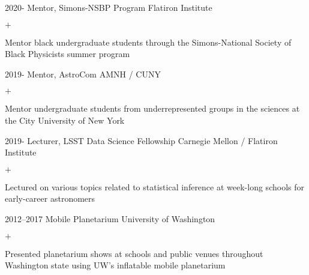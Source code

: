 \documentclass[]{luger-cv} %
\begin{document}
\begin{entrylist}


    \entry
    {2020-}
    {Mentor, Simons-NSBP Program}
    {Flatiron Institute}
    {%
        \vspace{-1em}
        \begin{list}{$+$}{\cvlist}
            \item Mentor black undergraduate students through the Simons-National
                  Society of Black Physicists summer program
        \end{list}
    }


    \entry
    {2019-}
    {Mentor, AstroCom}
    {AMNH / CUNY}
    {%
        \vspace{-1em}
        \begin{list}{$+$}{\cvlist}
            \item Mentor undergraduate students from underrepresented groups in the sciences
                  at the City University of New York
        \end{list}
    }


    \ifdefined \onepage \else

        \entry
        {2019-}
        {Lecturer, LSST Data Science Fellowship}
        {Carnegie Mellon / Flatiron Institute}
        {%
            \vspace{-1em}
            \begin{list}{$+$}{\cvlist}
                \item Lectured on various topics related to statistical
                      inference at week-long schools for early-career astronomers
            \end{list}
        }


        \entry
        {2012--2017}
        {Mobile Planetarium}
        {University of Washington}
        {%
            \vspace{-1em}
            \begin{list}{$+$}{\cvlist}
                \item Presented planetarium shows at schools and public venues throughout
                      Washington state using UW's inflatable mobile planetarium
            \end{list}
        }


\end{entrylist}
\end{document}

